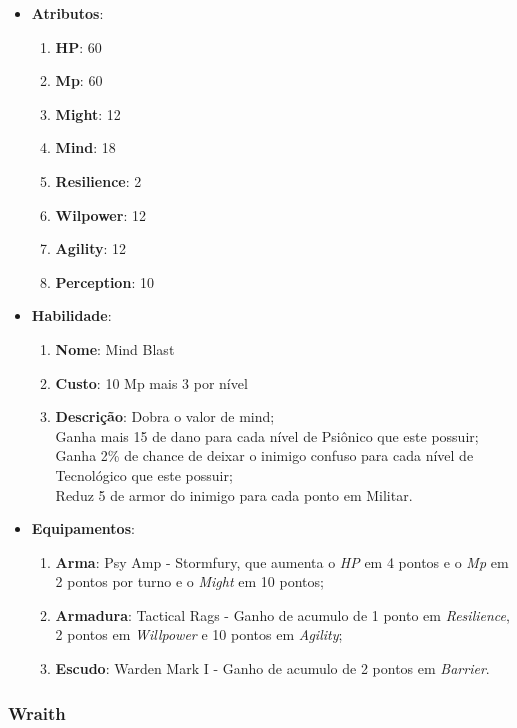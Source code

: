 \documentclass[11pt]{article} %
\begin{document}
\begin{itemize}
\item \textbf{Atributos}:
  \begin{enumerate}
    \item \textbf{HP}: 60
    \item \textbf{Mp}: 60
    \item \textbf{Might}: 12
    \item \textbf{Mind}: 18
    \item \textbf{Resilience}: 2
    \item \textbf{Wilpower}: 12
    \item \textbf{Agility}: 12
    \item \textbf{Perception}: 10
  \end{enumerate}
\item \textbf{Habilidade}:
  \begin{enumerate}
    \item \textbf{Nome}: Mind Blast
    \item \textbf{Custo}: 10 Mp mais 3 por nível
    \item \textbf{Descrição}: Dobra o valor de mind;\\
    Ganha mais 15 de dano para cada nível de Psiônico que este possuir;\\
    Ganha 2\% de chance de deixar o inimigo confuso para cada nível de Tecnológico que este possuir;\\
    Reduz 5 de armor do inimigo para cada ponto em Militar.
  \end{enumerate}
\item \textbf{Equipamentos}:
  \begin{enumerate}
    \item \textbf{Arma}: Psy Amp - Stormfury, que aumenta o \textit{HP} em 4 pontos e o \textit{Mp} em 2 pontos por turno e o \textit{Might} em 10 pontos;
    \item \textbf{Armadura}: Tactical Rags - Ganho de acumulo de 1 ponto em \textit{Resilience}, 2 pontos em \textit{Willpower} e 10 pontos em \textit{Agility};
    \item \textbf{Escudo}: Warden Mark I - Ganho de acumulo de 2 pontos em \textit{Barrier}.
  \end{enumerate}
\end{itemize}


\subsubsection{Wraith}
\end{document}
